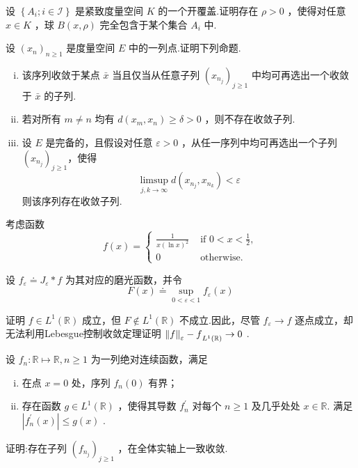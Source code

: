 \begin{rbhw}[index=1]
设 $\left\{  {{A}_{i};i \in  \mathcal{I}}\right\}$ 是紧致度量空间 $K$ 的一个开覆盖.证明存在 $\rho  > 0$ ，使得对任意 $x \in  K$ ，球 $B\left( {x,\rho }\right)$ 完全包含于某个集合 ${A}_{i}$ 中.
\end{rbhw}

\begin{rbhw}
    设 ${\left( {x}_{n}\right) }_{n \geq  1}$ 是度量空间 $E$ 中的一列点.证明下列命题.
    \begin{enumerate}[(i)]
        \item 该序列收敛于某点 $\bar{x}$ 当且仅当从任意子列 ${\left( {x}_{{n}_{j}}\right) }_{j \geq  1}$ 中均可再选出一个收敛于 $\bar{x}$ 的子列.
        \item 若对所有 $m \neq  n$ 均有 $d\left( {{x}_{m},{x}_{n}}\right)  \geq  \delta  > 0$ ，则不存在收敛子列.
        \item 设 $E$ 是完备的，且假设对任意 $\varepsilon  > 0$ ，从任一序列中均可再选出一个子列 ${\left( {x}_{{n}_{j}}\right) }_{j \geq  1}$，使得
\[
\limsup_{{j,k \rightarrow  \infty }}d\left( {{x}_{{n}_{j}},{x}_{{n}_{k}}}\right)  < \varepsilon
\]
则该序列存在收敛子列.
    \end{enumerate}
\end{rbhw}


\begin{rbhw}
考虑函数
\[
f\left( x\right)  = \left\{  \begin{matrix} \frac{1}{x{\left( \ln x\right) }^{2}} & \text{ if }0 < x < \frac{1}{2}, \\  0 & \text{ otherwise. } \end{matrix}\right.
\]

设 ${f}_{\varepsilon } \doteq  {J}_{\varepsilon } * f$ 为其对应的磨光函数，并令
\[
F\left( x\right)  \doteq  \mathop{\sup }\limits_{{0 < \varepsilon  < 1}}{f}_{\varepsilon }\left( x\right)
\]

证明 $f \in  {L}^{1}\left( \mathbb{R}\right)$ 成立，但 $F \notin  {L}^{1}\left( \mathbb{R}\right)$ 不成立.因此，尽管 ${f}_{\varepsilon } \rightarrow  f$ 逐点成立，却无法利用Lebesgue控制收敛定理证明 ${\norm{f}_{\varepsilon } - f}_{{L}^{1}\left( \mathbb{R}\right) } \rightarrow  0$ .
\end{rbhw}

\begin{rbhw}
设 ${f}_{n} : \mathbb{R} \mapsto  \mathbb{R},n \geq  1$ 为一列绝对连续函数，满足
\begin{enumerate}[(i)]
    \item 在点 $x = 0$ 处，序列 ${f}_{n}\left( 0\right)$ 有界；
    \item 存在函数 $g \in  {L}^{1}\left( \mathbb{R}\right)$ ，使得其导数 ${f}_{n}^{\prime }$ 对每个 $n \geq  1$ 及几乎处处 $x \in  \mathbb{R}.$ 满足 $\left| {{f}_{n}^{\prime }\left( x\right) }\right|  \leq  g\left( x\right)$ .
\end{enumerate}
证明:存在子列 ${\left( {f}_{{n}_{j}}\right) }_{j \geq  1}$ ，在全体实轴上一致收敛.
\end{rbhw}

